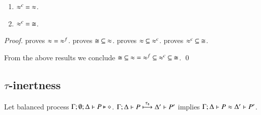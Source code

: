 
\begin{theorem}[Concidence]
	\begin{enumerate}
		\item	$\approx^{c}\ =\ \approx$.
		\item	$\approx^{c}\ =\ \cong$.
	\end{enumerate}
\end{theorem}

\begin{proof}
	\noi	{} proves $\wb\ =\ \wbf$.
		 proves $\cong\ \subseteq\ \wb$.
		 proves $\wb\ \subseteq\ \wbc$.
		 proves $\wbc\ \subseteq\ \cong$.

	\noi From the above results we conclude $\cong\ \subseteq\ \wb\ =\ \wbf\ \subseteq\ \wbc\ \subseteq\ \cong$. 
	\qed
\end{proof}


\subsection{$\tau$-inertness}
\label{app:sub_tau_inert}

\begin{proposition}\rm
	Let balanced \HOp process $\Gamma; \emptyset; \Delta \vdash P \triangleright \diamond$.
	$\Gamma; \Delta \vdash P \stackrel{\tau_{\mathsf{s}}}{\longmapsto} \Delta' \vdash P'$ implies
	$\Gamma; \Delta \vdash P \approx \Delta' \vdash P'$.
\end{proposition}

